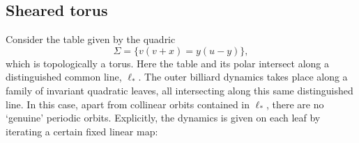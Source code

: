 \documentclass{article}
\begin{document}

\subsection{Sheared torus}\label{sec:TwistTori}

Consider the table given by the quadric \[ \Sigma = \{  v(v+x) = y(u-y) \},\]
which is topologically a torus. Here the table and its polar intersect along a distinguished common line, $\ell_*$. The outer billiard dynamics takes place along a family of invariant quadratic leaves, all intersecting along this same distinguished line. In this case, apart from collinear orbits contained in $\ell_*$, there are no `genuine' periodic orbits. Explicitly, the dynamics is given on each leaf by iterating a certain fixed linear map: %
\end{document}
